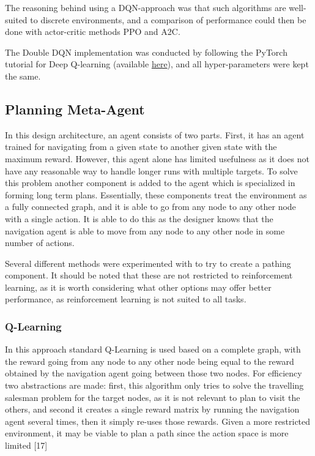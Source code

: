 \documentclass{article}
\begin{document}
	The reasoning behind using a DQN-approach was that such algorithms are well-suited to discrete environments, and a comparison of performance could then be done with actor-critic methods PPO and A2C.
	
	The Double DQN implementation was conducted by following the PyTorch tutorial for Deep Q-learning (available \href{https://pytorch.org/tutorials/intermediate/reinforcement_q_learning.html}{here}), and all hyper-parameters were kept the same.
	
	\subsection{Planning Meta-Agent}
	\label{planning}
	In this design architecture, an agent consists of two parts. First, it has an agent trained for navigating from a given state to another given state with the maximum reward. However, this agent alone has limited usefulness as it does not have any reasonable way to handle longer runs with multiple targets. To solve this problem another component is added to the agent which is specialized in forming long term plans. Essentially, these components treat the environment as a fully connected graph, and it is able to go from any node to any other node with a single action. It is able to do this as the designer knows that the navigation agent is able to move from any node to any other node in some number of actions.
	
	Several different methods were experimented with to try to create a pathing component. It should be noted that these are not restricted to reinforcement learning, as it is worth considering what other options may offer better performance, as reinforcement learning is not suited to all tasks.
	
	\subsubsection{Q-Learning}
	In this approach standard Q-Learning is used based on a complete graph, with the reward going from any node to any other node being equal to the reward obtained by the navigation agent going between those two nodes. For efficiency two abstractions are made: first, this algorithm only tries to solve the travelling salesman problem for the target nodes, as it is not relevant to plan to visit the others, and second it creates a single reward matrix by running the navigation agent several times, then it simply re-uses those rewards. Given a more restricted environment, it may be viable to plan a path since the action space is more limited [17]
	
\end{document}
